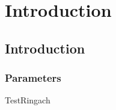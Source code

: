 \chapter{Introduction}

\section{Introduction}
\subsection{Parameters}

TestRingach~\cite{ringach2004haphazard}

